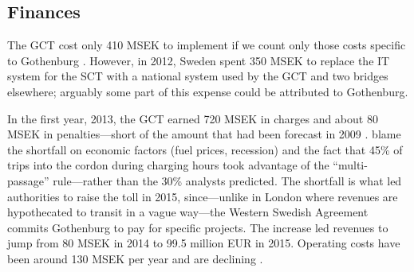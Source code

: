 \subsection{Finances}

The GCT cost only 410 MSEK to implement if we count only those costs specific to Gothenburg \citep[p. 40]{Borjesson2018}. However, in 2012, Sweden spent 350 MSEK to replace the IT system for the SCT with a national system used by the GCT and two bridges elsewhere; arguably some part of this expense could be attributed to Gothenburg. 

In the first year, 2013, the GCT earned 720 MSEK in charges and about 80 MSEK in penalties---short of the amount that had been forecast in 2009 \citep[pp. 142-143]{Borjesson2015}. \citet{Borjesson2015} blame the shortfall on economic factors (fuel prices, recession) and the fact that 45\% of trips into the cordon during charging hours took advantage of the ``multi-passage'' rule---rather than the 30\% analysts predicted. The shortfall is what led authorities to raise the toll in 2015, since---unlike in London where revenues are hypothecated to transit in a vague way---the Western Swedish Agreement commits Gothenburg to pay for specific projects. The increase led revenues to jump from 80 MSEK in 2014 to 99.5 million EUR in 2015. Operating costs have been around 130 MSEK per year and are declining \citep[table 3]{Borjesson2018}.





